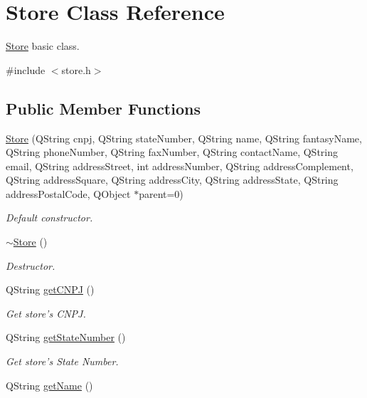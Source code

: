 \hypertarget{class_store}{\section{\-Store \-Class \-Reference}
\label{class_store}
}


\hyperlink{class_store}{\-Store} basic class.  




{\ttfamily \#include $<$store.\-h$>$}

\subsection*{\-Public \-Member \-Functions}
\begin{DoxyCompactItemize}
\item 
\hyperlink{class_store_aa4729241acdd3980527ed9de86373735}{\-Store} (\-Q\-String cnpj, \-Q\-String state\-Number, \-Q\-String name, \-Q\-String fantasy\-Name, \-Q\-String phone\-Number, \-Q\-String fax\-Number, \-Q\-String contact\-Name, \-Q\-String email, \-Q\-String address\-Street, int address\-Number, \-Q\-String address\-Complement, \-Q\-String address\-Square, \-Q\-String address\-City, \-Q\-String address\-State, \-Q\-String address\-Postal\-Code, \-Q\-Object $\ast$parent=0)
\begin{DoxyCompactList}\small\item\em \-Default constructor. \end{DoxyCompactList}\item 
\hyperlink{class_store_a4fd725fdb2de0632ed98bfbd131c2512}{$\sim$\-Store} ()
\begin{DoxyCompactList}\small\item\em \-Destructor. \end{DoxyCompactList}\item 
\-Q\-String \hyperlink{class_store_af10ada98d9716439c15360ecc82ae45c}{get\-C\-N\-P\-J} ()
\begin{DoxyCompactList}\small\item\em \-Get store's \-C\-N\-P\-J. \end{DoxyCompactList}\item 
\-Q\-String \hyperlink{class_store_a7ed8a4c8088b0dbf5e924dc8417978cc}{get\-State\-Number} ()
\begin{DoxyCompactList}\small\item\em \-Get store's \-State \-Number. \end{DoxyCompactList}\item 
\-Q\-String \hyperlink{class_store_afc7332061badfb25aa05be4f8d887750}{get\-Name} ()

\end{DoxyCompactItemize}
